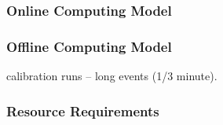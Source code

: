 \label{sec:35t}

\subsubsection{Online Computing Model}

\subsubsection{Offline Computing Model}

calibration runs -- long events (1/3 minute).

\subsubsection{Resource Requirements}


